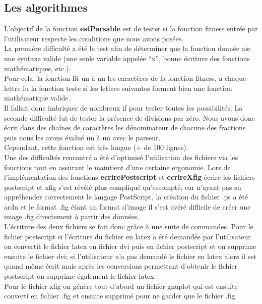 \documentclass[a4paper,11pt]{article}
\begin{document}
		\subsection{Les algorithmes }
			L’objectif de la fonction \textbf{estParsable} est de tester si la fonction fitness entrée par l’utilisateur respecte les conditions que nous avons posées.\\
			La première difficulté a été le test afin de déterminer que la fonction donnée aie une syntaxe valide (une seule variable appelée “x”, bonne écriture des fonctions mathématiques, etc.).\\
			Pour cela, la fonction lit  un à un les caractères de la fonction fitness, a chaque lettre lu la fonction teste si les lettres suivantes forment bien une fonction mathématique valide. \\
			Il fallait donc imbriquer de nombreux if pour tester toutes les possibilités. La seconde difficulté fut de tester la présence de divisions par zéro. Nous avons donc écrit dans des chaînes de caractères les dénominateur de chacune des fractions puis nous les avons évalué un à un avec le parseur.\\
			Cependant, cette fonction est très longue (+ de 100 lignes).\\
			
			Une des difficultés rencontré a été d'optimisé l'utilisation des fichiers via les fonctions tout en assurant le maintient d'une certaine ergonomie.
			Lors de l'implémentation des fonctions \textbf{ecrirePostscript} et  \textbf{ecrireXfig} écrire les fichiers postscript et xfig s’est révélé plus compliqué qu’escompté, car n’ayant pas su appréhender correctement le langage PostScript, la création du fichier .ps a été ardu et le format .fig étant un format d’image il s’est avéré difficile de créer une image .fig directement à partir des données.\\
			L’écriture des deux fichiers se fait donc grâce à une suite de commandes. Pour le fichier postscript si l'écriture du fichier en latex a été demandée par l’utilisateur on convertit le fichier latex en fichier dvi puis en fichier postscript et on supprime ensuite le fichier dvi; si l'utilisateur n’a pas demandé le fichier en latex alors il est quand même écrit mais après les conversions permettant d’obtenir le fichier postscript on supprime également le fichier latex.\\
			Pour le fichier xfig on génère tout d’abord un fichier gnuplot qui est ensuite converti en fichier .fig et ensuite supprimé pour ne garder que le fichier .fig.\\
\end{document}
